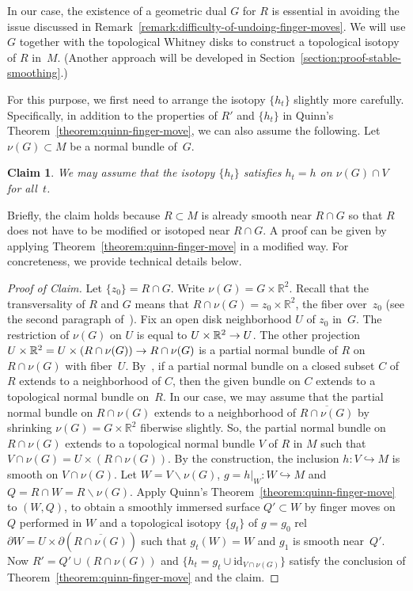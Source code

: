 \documentclass[11pt]{amsart}
\def\to{\mathchoice{\longrightarrow}{\rightarrow}{\rightarrow}{\rightarrow}}
\newtheorem*{claim}{Claim}
\theoremstyle{definition}
\theoremstyle{theorem-giventitle}
\theoremstyle{definition-giventitle}
\numberwithin{equation}{section}
\def\R{\mathbb{R}}
\def\id{\mathrm{id}}
\def\setminus{\smallsetminus}
\begin{document}
In our case, the existence of a geometric dual $G$ for $R$ is essential in avoiding the issue discussed in Remark~\ref{remark:difficulty-of-undoing-finger-moves}.
We will use $G$ together with the topological Whitney disks to construct a topological isotopy of $R$ in~$M$.
(Another approach will be developed in Section~\ref{section:proof-stable-smoothing}.)

For this purpose, we first need to arrange the isotopy $\{h_t\}$ slightly more carefully.
Specifically, in addition to the properties of $R'$ and $\{h_t\}$ in Quinn's Theorem~\ref{theorem:quinn-finger-move}, we can also assume the following.
Let $\nu(G)\subset M$ be a normal bundle of~$G$.

\begin{claim}
  We may assume that the isotopy $\{h_t\}$ satisfies $h_t = h$ on $\nu(G)\cap V$ for all~$t$.
\end{claim}

Briefly, the claim holds because $R\subset M$ is already smooth near $R\cap G$ so that $R$ does not have to be modified or isotoped near $R\cap G$.
A proof can be given by applying Theorem~\ref{theorem:quinn-finger-move} in a modified way.
For concreteness, we provide technical details below.

\begin{proof}[Proof of Claim]
  Let $\{z_0\} = R\cap G$.
  Write $\nu(G)=G\times \R^2$.
  Recall that the transversality of $R$ and $G$ means that $R\cap \nu(G) = z_0\times \R^2$, the fiber over~$z_0$ (see the second paragraph of~\cite[8.3]{Freedman-Quinn:1990-1}).
  Fix an open disk neighborhood $U$ of $z_0$ in~$G$.
  The restriction of $\nu(G)$ on $U$ is equal to $U\times \R^2 \to U$.
  The other projection $U \times \R^2 = U \times (R\cap \nu(G)) \to R\cap \nu(G)$ is a partial normal bundle of $R$ on $R\cap \nu(G)$ with fiber~$U$.
  By~\cite[9.3]{Freedman-Quinn:1990-1}, if a partial normal bundle on a closed subset $C$ of $R$ extends to a neighborhood of $C$, then the given bundle on $C$ extends to a topological normal bundle on~$R$.
  In our case, we may assume that the partial normal bundle on $R\cap \nu(G)$ extends to a neighborhood of $\overline{R\cap \nu(G)}$ by shrinking $\nu(G)=G\times \R^2$ fiberwise slightly.
  So, the partial normal bundle on $R\cap \nu(G)$ extends to a topological normal bundle $V$ of $R$ in $M$ such that $V\cap \nu(G) = U \times (R\cap \nu(G))$.
  By the construction, the inclusion $h\colon V \hookrightarrow M$ is smooth on $V\cap \nu(G)$.
  Let $W = V\setminus \nu(G)$, $g=h|_{W}\colon W \hookrightarrow M$ and $Q = R\cap W = R\setminus \nu(G)$.
  Apply Quinn's Theorem~\ref{theorem:quinn-finger-move} to $(W, Q)$, to obtain a smoothly immersed surface $Q'\subset W$ by finger moves on $Q$ performed in $W$ and a topological isotopy $\{g_t\}$ of $g=g_0$ rel $\partial W=U\times \partial (\overline{R\cap \nu(G)})$ such that $g_t(W)=W$ and $g_1$ is smooth near~$Q'$.
  Now $R'=Q'\cup (R\cap \nu(G))$ and $\{h_t=g_t \cup \id_{V\cap \nu(G)}\}$ satisfy the conclusion of Theorem~\ref{theorem:quinn-finger-move} and the claim.
\end{proof}
\end{document}

